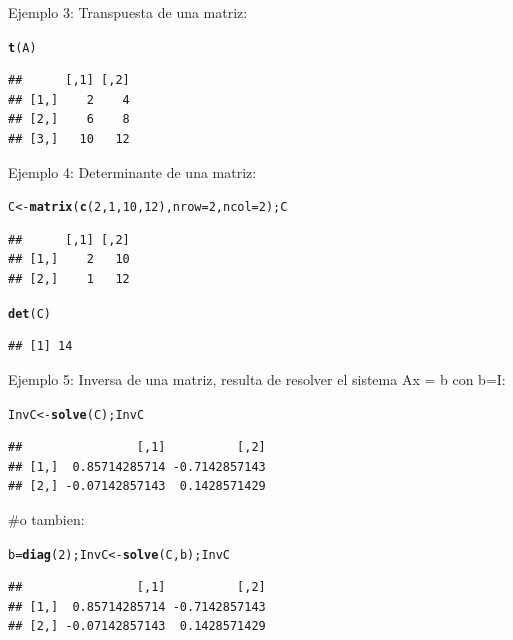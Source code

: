 \documentclass[12pt,letterpaper]{article}\usepackage[]{graphicx}\usepackage[]{color}
\makeatletter
\newcommand{\hlnum}[1]{\textcolor[rgb]{0.686,0.059,0.569}{#1}}%
\newcommand{\hlstd}[1]{\textcolor[rgb]{0.345,0.345,0.345}{#1}}%
\newcommand{\hlkwb}[1]{\textcolor[rgb]{0.69,0.353,0.396}{#1}}%
\newcommand{\hlkwc}[1]{\textcolor[rgb]{0.333,0.667,0.333}{#1}}%
\newcommand{\hlkwd}[1]{\textcolor[rgb]{0.737,0.353,0.396}{\textbf{#1}}}%
\newenvironment{kframe}{%
 \def\at@end@of@kframe{}%
 \ifinner\ifhmode%
  \def\at@end@of@kframe{\end{minipage}}%
  \begin{minipage}{\columnwidth}%
 \fi\fi%
 \def\FrameCommand##1{\hskip\@totalleftmargin \hskip-\fboxsep
 \colorbox{shadecolor}{##1}\hskip-\fboxsep
     \hskip-\linewidth \hskip-\@totalleftmargin \hskip\columnwidth}%
 \MakeFramed {\advance\hsize-\width
   \@totalleftmargin\z@ \linewidth\hsize
   \@setminipage}}%
 {\par\unskip\endMakeFramed%
 \at@end@of@kframe}
\newenvironment{knitrout}{}{} %
\makeatother
\begin{document}
Ejemplo 3: Transpuesta de una matriz:
\begin{knitrout}
\color{fgcolor}\begin{kframe}
\begin{alltt}
\hlkwd{t}\hlstd{(A)}
\end{alltt}
\begin{verbatim}
##      [,1] [,2]
## [1,]    2    4
## [2,]    6    8
## [3,]   10   12
\end{verbatim}
\end{kframe}
\end{knitrout}

Ejemplo 4: Determinante de una matriz:
\begin{knitrout}
\color{fgcolor}\begin{kframe}
\begin{alltt}
\hlstd{C} \hlkwb{<-} \hlkwd{matrix}\hlstd{(}\hlkwd{c}\hlstd{(}\hlnum{2}\hlstd{,} \hlnum{1}\hlstd{,} \hlnum{10}\hlstd{,} \hlnum{12}\hlstd{),} \hlkwc{nrow}\hlstd{=}\hlnum{2}\hlstd{,} \hlkwc{ncol}\hlstd{=}\hlnum{2}\hlstd{); C}
\end{alltt}
\begin{verbatim}
##      [,1] [,2]
## [1,]    2   10
## [2,]    1   12
\end{verbatim}
\begin{alltt}
\hlkwd{det}\hlstd{(C)}
\end{alltt}
\begin{verbatim}
## [1] 14
\end{verbatim}
\end{kframe}
\end{knitrout}

Ejemplo 5: Inversa de una matriz, resulta de resolver el sistema Ax = b con b=I: 
\begin{knitrout}
\color{fgcolor}\begin{kframe}
\begin{alltt}
\hlstd{InvC} \hlkwb{<-} \hlkwd{solve}\hlstd{(C) ; InvC}
\end{alltt}
\begin{verbatim}
##                [,1]          [,2]
## [1,]  0.85714285714 -0.7142857143
## [2,] -0.07142857143  0.1428571429
\end{verbatim}
\end{kframe}
\end{knitrout}
#o tambien:
\begin{knitrout}
\color{fgcolor}\begin{kframe}
\begin{alltt}
\hlstd{b}\hlkwb{=}\hlkwd{diag}\hlstd{(}\hlnum{2}\hlstd{); InvC}\hlkwb{<-}\hlkwd{solve}\hlstd{(C, b); InvC}
\end{alltt}
\begin{verbatim}
##                [,1]          [,2]
## [1,]  0.85714285714 -0.7142857143
## [2,] -0.07142857143  0.1428571429
\end{verbatim}
\end{kframe}
\end{knitrout}
\end{document}
